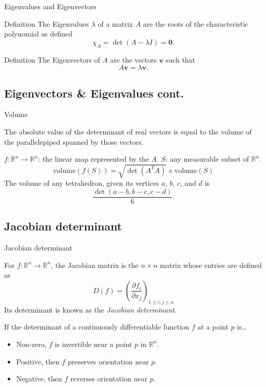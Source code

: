 \documentclass{beamer}
\begin{document}
\begin{frame}{Eigenvalues and Eigenvectors}

    \begin{block}{Definition}
        The Eigenvalues $\lambda$ of a matrix $A$ are the roots of the characteristic polynomial
        as defined
        \[
            \chi_A = \det(A - \lambda I) = \mathbf{0}.
        \]
    \end{block}

    \begin{block}{Definition}
        The Eigenvectors of $A$ are the vectors $\mathbf{v}$ such that
        \[
            A\mathbf{v} = \lambda \mathbf{v}.
        \]
    \end{block}

\end{frame}

\subsection{Eigenvectors & Eigenvalues cont.}

\begin{frame}{Volume}

    The absolute value of the determinant of real vectors is equal to the volume
    of the parallelepiped spanned by those vectors.

    $f : \mathbb{R}^n \to \mathbb{R}^n$: the linear map represented by the $A$.
    $S$: any measurable subset of $\mathbb{R}^n$.
    \[
        \text{volume}(f(S)) = \sqrt{\det{({A^T}A)}} \times \text{volume}(S)
    \]
    The volume of any tetrahedron, given its vertices $a$, $b$, $c$, and $d$ is
    \[
        \frac{\det(a - b, b - c, c - d)}{6}.
    \]
\end{frame}

\subsection{Jacobian determinant}

\begin{frame}{Jacobian determinant}

    For $f : \mathbb{R}^n \to \mathbb{R}^n$,
    the Jacobian matrix is the $n \times n$ matrix whose entries are defined as
    \[
        D(f) = {\left( \frac{\partial f_i}{\partial x_j} \right)}_{1 \leq i, j \leq n}
    \]
    Its determinant is known as the \emph{Jacobian determinant}.

    \begin{exampleblock}{}
        If the determinant of a continuously differentiable function $f$ at a point $p$ is\dots
        \begin{itemize}
            \item Non-zero, $f$ is invertible near a point $p$ in $\mathbb{R}^n$.
            \item Positive, then $f$ preserves orientation near $p$.
            \item Negative, then $f$ reverses orientation near $p$.
        \end{itemize}
    \end{exampleblock}

\end{frame}
\end{document}
